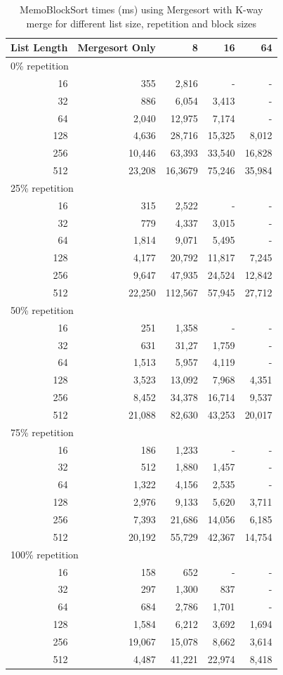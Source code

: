\documentclass[a4paper,12pt]{article}
\begin{document}
\begin{table}[H]
\centering
\begin{tabular}{|r|r|r|r|r|}   \hline
	{List Length} & {Mergesort Only} & {8} & {16} & {64} \\  \hline
	\multicolumn{5}{|l|}{ 0\% repetition} \\ \hline
	16 &355&2,816&- & - \\ 
	32 &886&6,054&3,413 & -\\ 
	64 &2,040&12,975 & 7,174 &-\\ 
	128 &4,636&28,716&15,325&8,012\\ 
	256 &10,446&63,393&33,540&16,828\\ 
	512 &23,208& 16,3679&75,246&35,984\\  \hline
	\multicolumn{5}{|l|}{ 25\% repetition} \\ \hline
	16 &315&2,522&- & - \\ 
	32 &779&4,337&3,015 & -\\ 
	64 &1,814&9,071 & 5,495&-\\ 
	128 &4,177&20,792&11,817&7,245\\ 
	256 &9,647&47,935&24,524&12,842\\ 
	512 &22,250&112,567&57,945&27,712\\  \hline
	\multicolumn{5}{|l|}{ 50\% repetition} \\ \hline
	16 &251&1,358&- & - \\ 
	32 &631&31,27&1,759 & -\\ 
	64 &1,513&5,957 & 4,119&-\\ 
	128 &3,523&13,092&7,968&4,351\\ 
	256 &8,452&34,378&16,714&9,537\\ 
	512 &21,088&82,630&43,253&20,017\\  \hline
	\multicolumn{5}{|l|}{ 75\% repetition} \\ \hline
	16 &186&1,233&- & - \\ 
	32 &512&1,880&1,457 & -\\ 
	64 &1,322&4,156& 2,535&-\\ 
	128 &2,976&9,133&5,620&3,711\\ 
	256 &7,393&21,686&14,056&6,185\\ 
	512 &20,192&55,729&42,367&14,754\\  \hline
	\multicolumn{5}{|l|}{ 100\% repetition} \\ \hline
	16 &158&652&- & - \\ 
	32 &297&1,300&837 & -\\ 
	64 &684&2,786& 1,701&-\\ 
	128 &1,584&6,212&3,692&1,694\\ 
	256 &19,067&15,078&8,662&3,614\\ 
	512 &4,487&41,221&22,974&8,418\\  \hline
\end{tabular}
\caption{MemoBlockSort times (ms) using Mergesort with K-way merge for different list size, repetition and block sizes}
\end{table}
\end{document}
